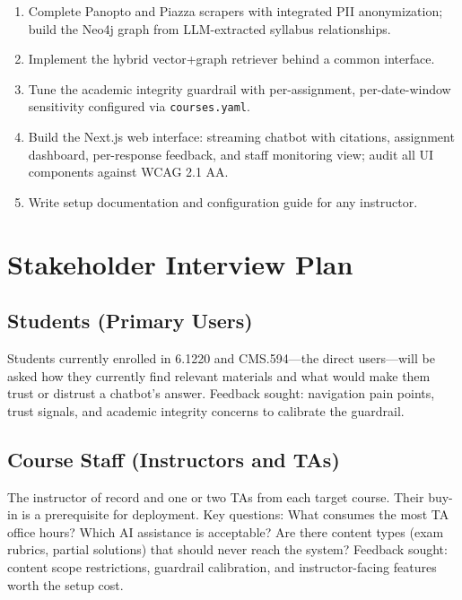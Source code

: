 \documentclass[12pt]{article}
\begin{document}
\begin{enumerate}
  \item Complete Panopto and Piazza scrapers with integrated PII anonymization;
        build the Neo4j graph from LLM-extracted syllabus relationships.
  \item Implement the hybrid vector+graph retriever behind a common interface.
  \item Tune the academic integrity guardrail with per-assignment, per-date-window
        sensitivity configured via \texttt{courses.yaml}.
  \item Build the Next.js web interface: streaming chatbot with citations,
        assignment dashboard, per-response feedback, and staff monitoring view;
        audit all UI components against WCAG 2.1 AA.
  \item Write setup documentation and configuration guide for any instructor.
\end{enumerate}

\section{Stakeholder Interview Plan}

\subsection{Students (Primary Users)}

Students currently enrolled in 6.1220 and CMS.594---the direct users---will be
asked how they currently find relevant materials and what would make them trust
or distrust a chatbot's answer. Feedback sought: navigation pain points, trust
signals, and academic integrity concerns to calibrate the guardrail.

\subsection{Course Staff (Instructors and TAs)}

The instructor of record and one or two TAs from each target course. Their
buy-in is a prerequisite for deployment. Key questions: What consumes the most
TA office hours? Which AI assistance is acceptable? Are there content types
(exam rubrics, partial solutions) that should never reach the system? Feedback
sought: content scope restrictions, guardrail calibration, and instructor-facing
features worth the setup cost.
\end{document}
